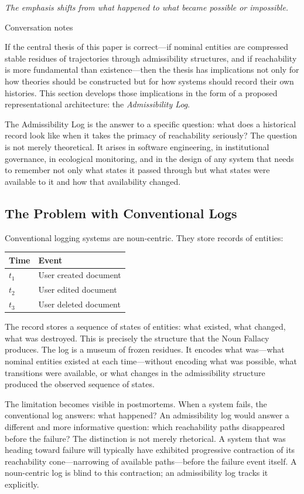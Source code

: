 \documentclass[12pt, a4paper]{article}
\theoremstyle{plain}
\theoremstyle{definition}
\theoremstyle{remark}
\begin{document}
\epigraph{\textit{The emphasis shifts from what happened to what became
possible or impossible.}}{Conversation notes}

\noindent
If the central thesis of this paper is correct---if nominal entities are
compressed stable residues of trajectories through admissibility structures,
and if reachability is more fundamental than existence---then the thesis
has implications not only for how theories should be constructed but for how
systems should record their own histories. This section develops those
implications in the form of a proposed representational architecture: the
\emph{Admissibility Log}.

The Admissibility Log is the answer to a specific question: what does a
historical record look like when it takes the primacy of reachability
seriously? The question is not merely theoretical. It arises in software
engineering, in institutional governance, in ecological monitoring, and in
the design of any system that needs to remember not only what states it
passed through but what states were available to it and how that availability
changed.

\subsection{The Problem with Conventional Logs}

Conventional logging systems are noun-centric. They store records of entities:

\begin{center}
\begin{tabular}{ll}
\toprule
\textbf{Time} & \textbf{Event} \\
\midrule
$t_1$ & User created document \\
$t_2$ & User edited document \\
$t_3$ & User deleted document \\
\bottomrule
\end{tabular}
\end{center}

The record stores a sequence of states of entities: what existed, what
changed, what was destroyed. This is precisely the structure that the Noun
Fallacy produces. The log is a museum of frozen residues. It encodes what
was---what nominal entities existed at each time---without encoding what
was possible, what transitions were available, or what changes in the
admissibility structure produced the observed sequence of states.

The limitation becomes visible in postmortems. When a system fails, the
conventional log answers: what happened? An admissibility log would answer
a different and more informative question: which reachability paths
disappeared before the failure? The distinction is not merely rhetorical.
A system that was heading toward failure will typically have exhibited
progressive contraction of its reachability cone---narrowing of available
paths---before the failure event itself. A noun-centric log is blind to
this contraction; an admissibility log tracks it explicitly.
\end{document}
